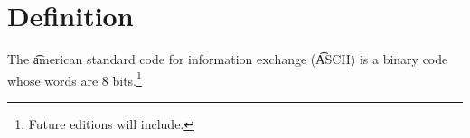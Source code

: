 
\section*{Definition}

The \t{american standard code for information exchange} (\t{ASCII}) is a binary code whose words are 8 bits.\footnote{Future editions will include.}

\blankpage